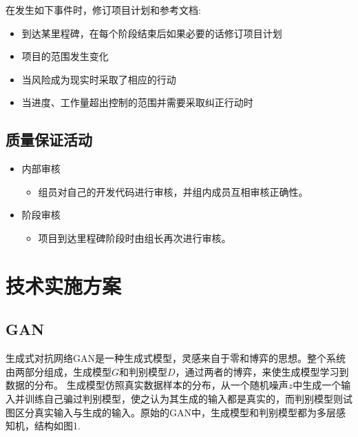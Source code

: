 \documentclass[hyperref, a4paper]{ctexart}
\providecommand{\tightlist}{%
  \setlength{\itemsep}{0pt}\setlength{\parskip}{0pt}}
\begin{document}
在发生如下事件时，修订项目计划和参考文档:

\begin{itemize}
\tightlist
\item
  到达某里程碑，在每个阶段结束后如果必要的话修订项目计划
\item
  项目的范围发生变化
\item
  当风险成为现实时采取了相应的行动
\item
  当进度、工作量超出控制的范围并需要采取纠正行动时
\end{itemize}

\hypertarget{ux8d28ux91cfux4fddux8bc1ux6d3bux52a8}{%
\subsection{质量保证活动}\label{ux8d28ux91cfux4fddux8bc1ux6d3bux52a8}}

\begin{itemize}
\tightlist
\item
  内部审核

  \begin{itemize}
  \tightlist
  \item
    组员对自己的开发代码进行审核，并组内成员互相审核正确性。
  \end{itemize}
\item
  阶段审核

  \begin{itemize}
  \tightlist
  \item
    项目到达里程碑阶段时由组长再次进行审核。
  \end{itemize}
\end{itemize}

\hypertarget{ux6280ux672fux5b9eux65bdux65b9ux6848}{%
\section{技术实施方案}\label{ux6280ux672fux5b9eux65bdux65b9ux6848}}

\hypertarget{gan}{%
\subsection{GAN}\label{gan}}

生成式对抗网络GAN是一种生成式模型，灵感来自于零和博弈的思想。整个系统由两部分组成，生成模型\(G\)和判别模型\(D\)，通过两者的博弈，来使生成模型学习到数据的分布。
生成模型仿照真实数据样本的分布，从一个随机噪声\(z\)中生成一个输入并训练自己骗过判别模型，使之认为其生成的输入都是真实的，而判别模型则试图区分真实输入与生成的输入。原始的GAN中，生成模型和判别模型都为多层感知机，结构如图1.
\end{document}
